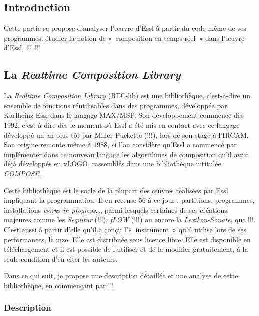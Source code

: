 \documentclass[a4paper,12pt]{article}
\newcommand{\guill}[1]{«~#1~»}
\newcommand{\maze}[0]{m\symbol{64}ze\textdegree2}
\begin{document}
\subsection{Introduction}

Cette partie se propose d'analyser l'œuvre d'Essl à partir du code même de ses programmes. 
étudier la notion de \guill{composition en temps réel} dans l'œuvre d'Essl, !!! !!!

\subsection{La \emph{Realtime Composition Library}}

La \emph{Realtime Composition Library} (RTC-lib) est une bibliothèque, c'est-à-dire un ensemble de fonctions réutilisables dans des programmes, développée par Karlheinz Essl dans le langage MAX/MSP. Son développement commence dès 1992, c'est-à-dire dès le moment où Essl a été mis en contact avec ce langage développé un an plus tôt par Miller Puckette (!!!), lors de son stage à l'IRCAM. Son origine remonte même à 1988, si l'on considère qu'Essl a commencé par implémenter dans ce nouveau langage les algorithmes de composition qu'il avait déjà développés en xLOGO, rassemblés dans une bibliothèque intitulée \emph{COMPOSE}.

Cette bibliothèque est le socle de la plupart des œuvres réalisées par Essl impliquant la programmation. Il en recense 56 à ce jour : partitions, programmes, installations \emph{works-in-progress}\dots, parmi lesquels certaines de ses créations majeures comme les \emph{Sequitur} (!!!), \emph{fLOW} (!!!) ou encore la \emph{Lexikon-Sonate}, que !!!. C'est aussi à partir d'elle qu'il a conçu l'\guill{instrument} qu'il utilise lors de ses performances, le \maze. Elle est distribuée sous licence libre. Elle est disponible en téléchargement et il est possible de l'utiliser et de la modifier gratuitement, à la seule condition d'en citer les auteurs.

Dans ce qui suit, je propose une description détaillée et une analyse de cette bibliothèque, en commençant par !!!


\subsubsection{Description}
\end{document}
